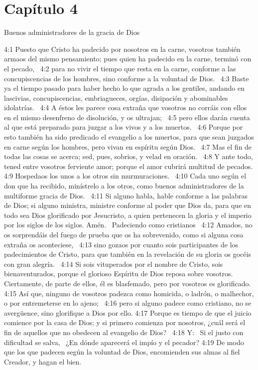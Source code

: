 \section*{Capítulo 4}
Buenos administradores de la gracia de Dios  

4:1 Puesto que Cristo ha padecido por nosotros en la carne, vosotros también armaos del mismo pensamiento; pues quien ha padecido en la carne, terminó con el pecado,  
4:2 para no vivir el tiempo que resta en la carne, conforme a las concupiscencias de los hombres, sino conforme a la voluntad de Dios.  
4:3 Baste ya el tiempo pasado para haber hecho lo que agrada a los gentiles, andando en lascivias, concupiscencias, embriagueces, orgías, disipación y abominables idolatrías.  
4:4 A éstos les parece cosa extraña que vosotros no corráis con ellos en el mismo desenfreno de disolución, y os ultrajan;  
4:5 pero ellos darán cuenta al que está preparado para juzgar a los vivos y a los muertos.  
4:6 Porque por esto también ha sido predicado el evangelio a los muertos, para que sean juzgados en carne según los hombres, pero vivan en espíritu según Dios.  
4:7 Mas el fin de todas las cosas se acerca; sed, pues, sobrios, y velad en oración.  
4:8 Y ante todo, tened entre vosotros ferviente amor; porque el amor cubrirá multitud de pecados. 
4:9 Hospedaos los unos a los otros sin murmuraciones.  
4:10 Cada uno según el don que ha recibido, minístrelo a los otros, como buenos administradores de la multiforme gracia de Dios.  
4:11 Si alguno habla, hable conforme a las palabras de Dios; si alguno ministra, ministre conforme al poder que Dios da, para que en todo sea Dios glorificado por Jesucristo, a quien pertenecen la gloria y el imperio por los siglos de los siglos. Amén.  
Padeciendo como cristianos  
4:12 Amados, no os sorprendáis del fuego de prueba que os ha sobrevenido, como si alguna cosa extraña os aconteciese,  
4:13 sino gozaos por cuanto sois participantes de los padecimientos de Cristo, para que también en la revelación de su gloria os gocéis con gran alegría.  
4:14 Si sois vituperados por el nombre de Cristo, sois bienaventurados, porque el glorioso Espíritu de Dios reposa sobre vosotros. Ciertamente, de parte de ellos, él es blasfemado, pero por vosotros es glorificado.  
4:15 Así que, ninguno de vosotros padezca como homicida, o ladrón, o malhechor, o por entremeterse en lo ajeno;  
4:16 pero si alguno padece como cristiano, no se avergüence, sino glorifique a Dios por ello. 
4:17 Porque es tiempo de que el juicio comience por la casa de Dios; y si primero comienza por nosotros, ¿cuál será el fin de aquellos que no obedecen al evangelio de Dios?  
4:18 Y:  
Si el justo con dificultad se salva,  
¿En dónde aparecerá el impío y el pecador? 
4:19 De modo que los que padecen según la voluntad de Dios, encomienden sus almas al fiel Creador, y hagan el bien.  
